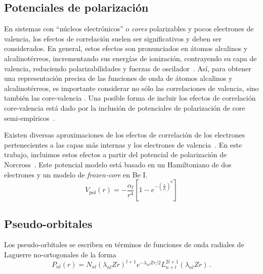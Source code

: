 \subsection{Potenciales de polarización}

En sistemas con ``núcleos electrónicos'' o \textit{cores} polarizables y 
pocos electrones de valencia, los efectos de correlación suelen ser 
significativos y deben ser considerados. En general, estos efectos son 
pronunciados en átomos alcalinos y alcalinotérreos, incrementando sus 
energías de ionización, contrayendo su capa de valencia, reduciendo 
polarizabilidades y fuerzas de oscilador~\cite{Muller:83}. 
Así, para obtener una representación precisa de las funciones de onda de 
átomos alcalinos y alcalinotérreos, es importante considerar no sólo las 
correlaciones de valencia, sino también las core-valencia 
\cite{Bartschat:04}. Una posible forma de incluir los efectos de 
correlación core-valencia está dado por la inclusión de potenciales de 
polarización de core semi-empíricos~\cite{Loughlin:88}.

Existen diversas aproximaciones de los efectos de correlación de los 
electrones pertenecientes a las capas más internas y los electrones de 
valencia~\cite{Seaton:72,Loughlin:73,Migdalek:78}. En este trabajo, 
incluimos estos efectos a partir del potencial de polarización de 
Norcross~\cite{Norcross:76}. Este potencial modelo está basado en un 
Hamiltoniano de dos electrones y un modelo de \textit{frozen-core} en 
Be I.
\begin{equation*}
 V_{\textrm{pol}}(r) = -\frac{\alpha_l}{r^4}\left[1-
e^{-\left(\tfrac{r}{\rho_l}\right)^6}\right]
\label{eq:Norcross-pot}
\end{equation*}

\subsection{Pseudo-orbitales}

Los pseudo-orbitales se escriben en términos de funciones de onda 
radiales de Laguerre no-ortogonales de la forma
\begin{equation}
P_{nl}(r) = N_{nl}(\lambda_{nl}Zr)^{l+1} e^{-\lambda_{nl}Zr/2} 
L_{n+l}^{2l+1}(\lambda_{nl}Zr)\,.
\label{eq:pseudo}
\end{equation}

